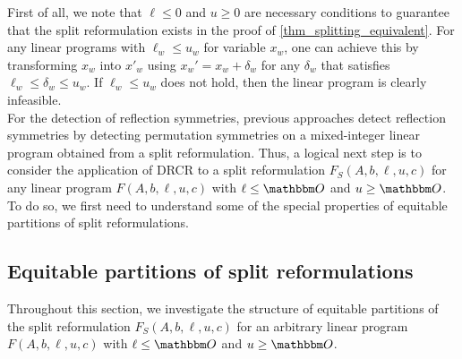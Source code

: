 \documentclass[pdflatex,sn-mathphys-num]{sn-jnl}%
\theoremstyle{thmstyleone}%
\theoremstyle{thmstylethree}%
\theoremstyle{thmstyletwo}%
\begin{document}
 First of all, we note that $\ell \leq 0$ and $u \geq 0$ are necessary conditions to guarantee that the split reformulation exists in the proof of \cref{thm_splitting_equivalent}. For any linear programs with $\ell_w \leq u_w$ for variable $x_w$, one can achieve this by transforming $x_w$ into $x'_w$ using $x_w' = x_w + \delta_w$ for any $\delta_w$ that satisfies $\ell_w \leq \delta_w \leq u_w$. If $\ell_w \leq u_w$ does not hold, then the linear program is clearly infeasible.\\
 
For the detection of reflection symmetries, previous approaches detect reflection symmetries by detecting permutation symmetries on a mixed-integer linear program obtained from a split reformulation.
Thus, a logical next step is to consider the application of DRCR to a split reformulation $F_S(A,b,\ell,u,c)$ for any linear program $F(A,b,\ell,u,c)$ with $\ell \leq \zerovec$ and $u\geq \zerovec$. To do so, we first need to understand some of the special properties of equitable partitions of split reformulations.

\subsection{Equitable partitions of split reformulations}
Throughout this section, we investigate the structure of equitable partitions of the split reformulation $F_S(A,b,\ell,u,c)$ for an arbitrary linear program $F(A,b,\ell,u,c)$ with $\ell \leq \zerovec$ and $u\geq \zerovec$.
\end{document}
